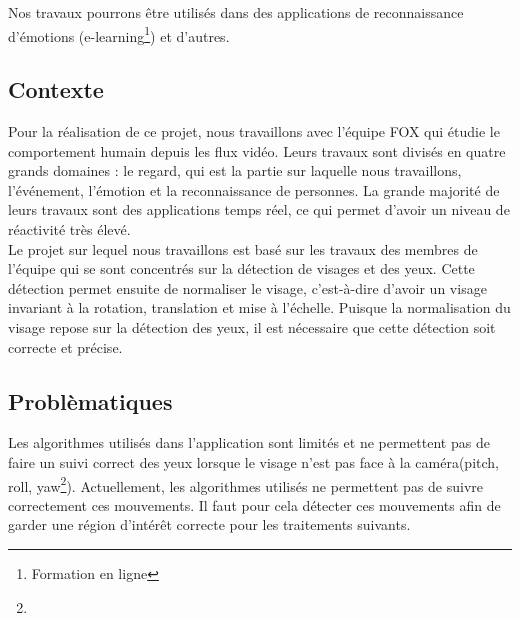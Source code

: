 Nos travaux pourrons être utilisés dans des applications de reconnaissance d'émotions 
(e-learning\footnote{Formation en ligne}) et d'autres.



\subsection{Contexte}
Pour la réalisation de ce projet, nous travaillons avec l'équipe FOX qui étudie
le comportement humain depuis les flux vidéo. Leurs travaux sont
divisés en quatre grands domaines : le regard, qui est la partie sur laquelle nous travaillons, l'événement, l'émotion et la
reconnaissance de personnes. La grande majorité de leurs travaux sont
des applications temps réel, ce qui permet d'avoir un niveau de réactivité très élevé.\\ 

Le projet sur lequel nous travaillons est basé sur les travaux des membres de l'équipe qui se sont concentrés sur la
détection de visages et des yeux. Cette détection permet ensuite de normaliser le visage, c'est-à-dire
d'avoir un visage invariant à la rotation, translation et mise à l'échelle.
Puisque la normalisation du visage repose sur la détection des yeux, il est nécessaire que cette 
détection soit correcte et précise. \\

\subsection{Problèmatiques}
Les algorithmes utilisés dans l'application sont limités et ne permettent pas de faire un suivi correct des yeux 
lorsque le visage n'est pas face à la caméra(pitch, roll, yaw\footnote{}). Actuellement, les algorithmes utilisés ne permettent pas
de suivre correctement ces mouvements. Il faut pour cela détecter
ces mouvements afin de garder une région d'intérêt correcte pour les traitements suivants.\\

